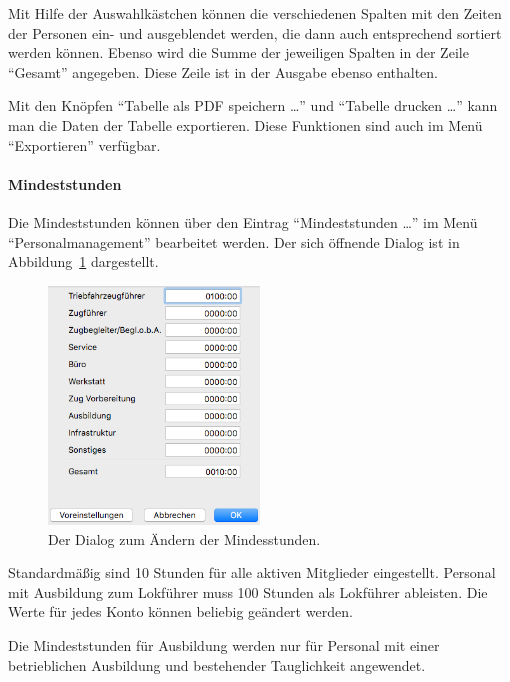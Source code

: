 Mit Hilfe der Auswahlkästchen können die verschiedenen Spalten mit den Zeiten der Personen ein- und ausgeblendet werden, die dann auch entsprechend sortiert werden können.
Ebenso wird die Summe der jeweiligen Spalten in der Zeile "`Gesamt"' angegeben.
Diese Zeile ist in der Ausgabe ebenso enthalten.


Mit den Knöpfen "`Tabelle als PDF speichern \dots"' und "`Tabelle drucken \dots"' kann man die Daten der Tabelle exportieren.
Diese Funktionen sind auch im Menü "`Exportieren"' verfügbar.


\paragraph{Mindeststunden}
Die Mindeststunden können über den Eintrag "`Mindeststunden \dots"' im Menü "`Personalmanagement"' bearbeitet werden.
Der sich öffnende Dialog ist in Abbildung~\ref{fig:personal:mindeststunden} dargestellt.

\begin{figure}[!h]
	\centering
	\includegraphics[width=0.5\textwidth]{img/personal_mindeststunden}
	\caption{Der Dialog zum Ändern der Mindesstunden.}
	\label{fig:personal:mindeststunden}
\end{figure}

Standardmäßig sind 10 Stunden für alle aktiven Mitglieder eingestellt.
Personal mit Ausbildung zum Lokführer muss 100 Stunden als Lokführer ableisten.
Die Werte für jedes Konto können beliebig geändert werden.

Die Mindeststunden für Ausbildung werden nur für Personal mit einer betrieblichen Ausbildung und bestehender Tauglichkeit angewendet.




